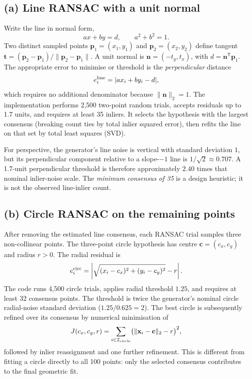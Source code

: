 \documentclass[11pt,a4paper]{article}
\begin{document}
\subsection{(a) Line RANSAC with a unit normal}
Write the line in normal form,
\begin{equation}
  a x+b y=d, \qquad a^2+b^2=1.
\end{equation}
Two distinct sampled points $\mathbf{p}_1=(x_1,y_1)$ and $\mathbf{p}_2=(x_2,y_2)$ define tangent $\mathbf{t}=(\mathbf{p}_2-\mathbf{p}_1)/\|\mathbf{p}_2-\mathbf{p}_1\|$. A unit normal is $\mathbf{n}=(-t_y,t_x)$, with $d=\mathbf{n}^{\mathsf T}\mathbf{p}_1$. The appropriate error to minimise or threshold is the \emph{perpendicular} distance
\begin{equation}
  e_i^{\rm line}=|a x_i+b y_i-d|,
\end{equation}
which requires no additional denominator because $\|\mathbf{n}\|_2=1$. The implementation performs 2,500 two-point random trials, accepts residuals up to 1.7 units, and requires at least 35 inliers. It selects the hypothesis with the largest consensus (breaking count ties by total inlier squared error), then refits the line on that set by total least squares (SVD).

For perspective, the generator's line noise is vertical with standard deviation $1$, but its perpendicular component relative to a slope-$-1$ line is $1/\sqrt{2}\approx0.707$. A 1.7-unit perpendicular threshold is therefore approximately $2.40$ times that nominal inlier-noise scale. The \emph{minimum consensus of 35} is a design heuristic; it is not the observed line-inlier count.

\subsection{(b) Circle RANSAC on the remaining points}
After removing the estimated line consensus, each RANSAC trial samples three non-collinear points. The three-point circle hypothesis has centre $\mathbf{c}=(c_x,c_y)$ and radius $r>0$. The radial residual is
\begin{equation}
  e_i^{\rm circ}=\left|\sqrt{(x_i-c_x)^2+(y_i-c_y)^2}-r\right|.
\end{equation}
The code runs 4,500 circle trials, applies radial threshold $1.25$, and requires at least 32 consensus points. The threshold is twice the generator's nominal circle radial-noise standard deviation ($1.25/0.625=2$). The best circle is subsequently refined over its consensus by numerical minimisation of
\begin{equation}
 J(c_x,c_y,r)=\sum_{i\in\mathcal I_{\rm circle}}\bigl(\|\mathbf{x}_i-\mathbf{c}\|_2-r\bigr)^2,
\end{equation}
followed by inlier reassignment and one further refinement. This is different from fitting a circle directly to all 100 points: only the selected consensus contributes to the final geometric fit.
\end{document}
